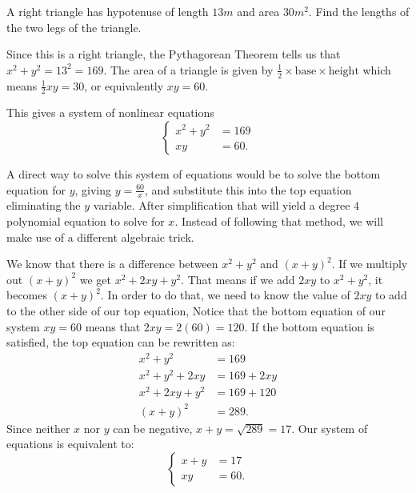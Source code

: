 \documentclass[nooutcomes]{ximera}
\begin{document}
	\begin{exercise}
		A right triangle has hypotenuse of length $13 m$ and area $30 m^2$. Find the lengths of the two legs of the triangle.
		\begin{image}
		\end{image}
		\begin{explanation}
			
			Since this is a right triangle, the Pythagorean Theorem tells us that $x^2 + y^2 = 13^2 = 169$.
			The area of a triangle is given by $\frac{1}{2}\times \text{base} \times \text{height}$ which means
			$\frac{1}{2}xy = 30$, or equivalently $xy = 60$.

			This gives a system of nonlinear equations
			$$	\begin{cases}
				x^2+y^2 &= 169\\
				xy &= 60.
			\end{cases}	$$
			
			A direct way to solve this system of equations would be to solve the bottom equation for $y$, giving $y = \frac{60}{x}$, and substitute this into the top equation
			eliminating the $y$ variable. After simplification that will yield a degree $4$ polynomial equation to solve for $x$. Instead of following that method, we will make 
			use of a different algebraic trick.
			
			We know that there is a difference between $x^2 + y^2$ and $(x+y)^2$. If we multiply out $(x+y)^2$ we get $x^2 + 2xy + y^2$. That means if we add $2xy$
			to $x^2 + y^2$, it becomes $(x+y)^2$. In order to do that, we need to know the value of $2xy$ to add to the other side of our top equation,
			Notice that the bottom equation of our system $xy=60$ means that $2xy = 2(60)=120$. If the bottom equation is satisfied, the top equation can be
			rewritten as:
			\begin{align*}
				x^2 + y^2 &= 169\\
				x^2 + y^2 + 2xy &= 169 + 2xy\\
				x^2 + 2xy + y^2 &= 169 + 120\\				
				\left( x + y \right)^2 &= 289.
			\end{align*}
			Since neither $x$ nor $y$ can be negative, $x+y = \sqrt{289} = 17$.
			Our system of equations is equivalent to:
			$$	\begin{cases}
				x + y &= 17\\
				xy &= 60.
			\end{cases}	$$
			

\end{explanation}
\end{exercise}
\end{document}
